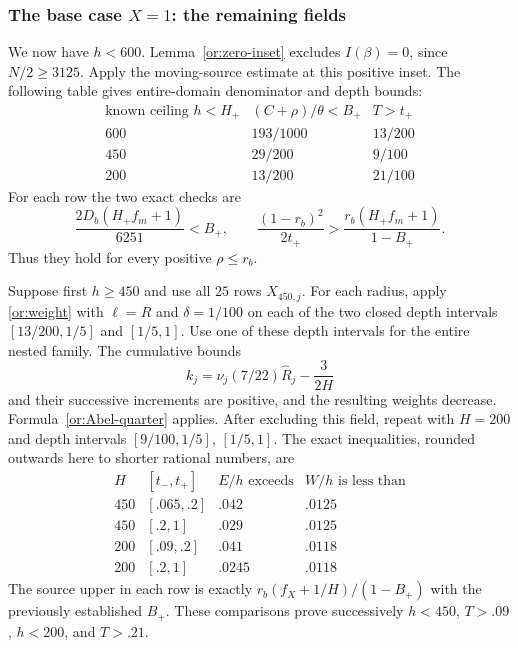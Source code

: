 \documentclass[11pt,reqno]{amsart}
\numberwithin{equation}{section}
\theoremstyle{definition}
\theoremstyle{remark}
\begin{document}
\subsubsection{The base case $X=1$: the remaining fields}

We now have $h<600$.  Lemma~\ref{or:zero-inset} excludes $I(\beta)=0$,
since $N/2\ge3125$.
Apply the moving-source estimate at this positive inset.
The following table gives entire-domain denominator and depth bounds:
\begin{equation}\label{or:base-moving-table}
\begin{array}{c|c|c}
 \text{known ceiling }h<H_+& (C+\rho)/\theta<B_+&T>t_+\\ \hline
 600&193/1000&13/200\\
 450&29/200&9/100\\
 200&13/200&21/100
\end{array}
\end{equation}
For each row the two exact checks are
\[
 \frac{2D_b(H_+f_m+1)}{6251}<B_+,\qquad
 \frac{(1-r_b)^2}{2t_+}>
                   \frac{r_b(H_+f_m+1)}{1-B_+}.
\]
Thus they hold for every positive $\rho\le r_b$.

Suppose first $h\ge450$ and use all $25$ rows $X_{450,j}$.
For each radius, apply \eqref{or:weight} with $\ell=R$ and
$\delta=1/100$ on each of the two closed depth intervals
$[13/200,1/5]$ and $[1/5,1]$.  Use one of these depth intervals
for the entire nested family.  The cumulative bounds
\[
 k_j=\nu_j(7/22)\widehat R_j-\frac{3}{2H}
\]
and their successive increments are positive, and the resulting
weights decrease.  Formula~\eqref{or:Abel-quarter} applies.
After excluding this field, repeat with $H=200$ and depth intervals
$[9/100,1/5]$, $[1/5,1]$.  The exact inequalities, rounded outwards
here to shorter rational numbers, are
\begin{equation}\label{or:base-middle-table}
\begin{array}{c|c|c|c}
 H&[t_-,t_+]&E/h\text{ exceeds}&W/h\text{ is less than}\\ \hline
 450&[.065,.2]&.042&.0125\\
 450&[.2,1]&.029&.0125\\
 200&[.09,.2]&.041&.0118\\
 200&[.2,1]&.0245&.0118
\end{array}
\end{equation}
The source upper in each row is exactly
$r_b(f_X+1/H)/(1-B_+)$ with the previously established $B_+$.
These comparisons prove successively $h<450$, $T>.09$, $h<200$,
and $T>.21$.
\end{document}
